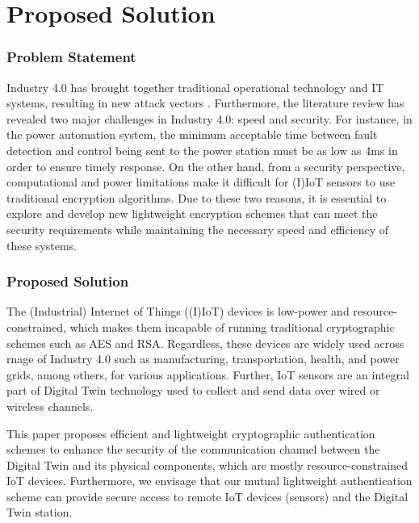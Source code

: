 

\chapter{Proposed Solution}
\label{Chapter5} %

\subsection{Problem Statement}
Industry 4.0 has brought together traditional operational technology and IT systems, resulting in new attack vectors \cite{dietzUnleashingDigitalTwin2020}. Furthermore, the literature review has revealed two major challenges in Industry 4.0: speed and security. For instance, in the power automation system, the minimum acceptable time between fault detection and control being sent to the power station must be as low as 4ms \cite{rajkumar_cyber_2020} in order to ensure timely response. On the other hand, from a security perspective, computational and power limitations make it difficult for (I)IoT sensors to use traditional encryption algorithms. Due to these two reasons, it is essential to explore and develop new lightweight encryption schemes that can meet the security requirements while maintaining the necessary speed and efficiency of these systems.

\subsection{Proposed Solution}
The (Industrial) Internet of Things ((I)IoT) devices is low-power and resource-constrained, which makes them incapable of running traditional cryptographic schemes such as AES and RSA. Regardless, these devices are widely used across rnage of Industry 4.0 such as manufacturing, transportation, health, and power grids, among others, for various applications. Further, IoT sensors are an integral part of Digital Twin technology used to collect and send data over wired or wireless channels.

This paper proposes efficient and lightweight cryptographic authentication schemes to enhance the security of the communication channel between the Digital Twin and its physical components, which are mostly resource-constrained IoT devices. Furthermore, we envisage that our mutual lightweight authentication scheme can provide secure access to remote IoT devices (sensors) and the Digital Twin station.

